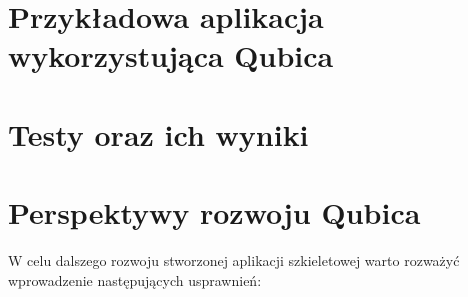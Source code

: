 \documentclass[12pt]{report}
\begin{document}
\section{Przykładowa aplikacja wykorzystująca Qubica}

\section{Testy oraz ich wyniki}

\section{Perspektywy rozwoju Qubica}
\label{perspektywyqubic}

W celu dalszego rozwoju stworzonej aplikacji szkieletowej warto rozważyć wprowadzenie następujących usprawnień:
\end{document}
